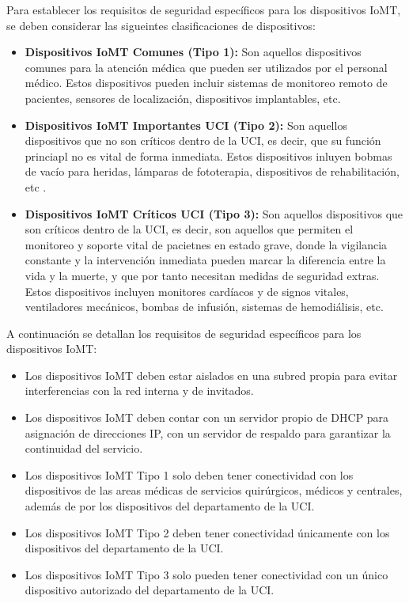 Para establecer los requisitos de seguridad específicos para los dispositivos IoMT, se deben considerar las sigueintes clasificaciones de dispositivos:
\begin{itemize}
    \item \textbf{Dispositivos IoMT Comunes (Tipo 1):} Son aquellos dispositivos comunes para la atención médica que pueden ser utilizados por el personal 
    médico. Estos dispositivos pueden incluir sistemas de monitoreo remoto de pacientes, sensores de localización, dispositivos implantables, etc.
    \item \textbf{Dispositivos IoMT Importantes UCI (Tipo 2):} Son aquellos dispositivos que no son críticos dentro de la UCI, es decir, que su función princiapl no es vital de forma 
    inmediata. Estos dispositivos inluyen bobmas de vacío para heridas, lámparas de fototerapia, dispositivos de rehabilitación, etc \cite{IoMT-UCI}.
    \item \textbf{Dispositivos IoMT Críticos UCI (Tipo 3):} Son aquellos dispositivos que son críticos dentro de la UCI, es decir, son aquellos que permiten el monitoreo y soporte
    vital de pacietnes en estado grave, donde la vigilancia constante y la intervención inmediata pueden marcar la diferencia entre la vida y la muerte, y que por tanto necesitan medidas
    de seguridad extras. Estos dispositivos incluyen monitores cardíacos y de signos vitales, ventiladores mecánicos, bombas de infusión, sistemas de hemodiálisis, etc\cite{IoMT-UCI}.
\end{itemize}
A continuación se detallan los requisitos de seguridad específicos para los dispositivos IoMT:
\begin{itemize}
    \item Los dispositivos IoMT deben estar aislados en una subred propia para evitar interferencias con la red interna y de invitados.
    \item Los dispositivos IoMT deben contar con un servidor propio de DHCP para asignación de direcciones IP, con un servidor de respaldo para garantizar la continuidad del servicio.
    \item Los dispositivos IoMT Tipo 1 solo deben tener conectividad con los dispositivos de las areas médicas de servicios quirúrgicos, médicos y centrales, 
    además de por los dispositivos del departamento de la UCI.
    \item Los dispositivos IoMT Tipo 2 deben tener conectividad únicamente con los dispositivos del departamento de la UCI.
    \item Los dispositivos IoMT Tipo 3 solo pueden tener conectividad con un único dispositivo autorizado del departamento de la UCI.
\end{itemize}



